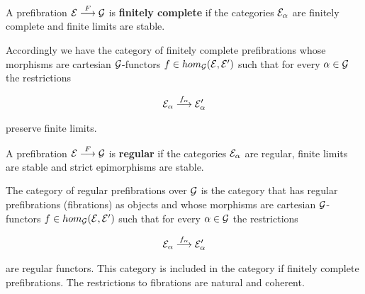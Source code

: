 
\begin{definition}
A prefibration ${\mathcal{E} \overset {F} {\longrightarrow} \mathcal{G}}$  is \textbf{finitely complete} if the categories $\mathcal{E}_\alpha$ are finitely complete and finite limits are stable.
\end{definition}

\noindent Accordingly we have the category of finitely complete prefibrations whose morphisms are cartesian $\mathcal{G}$-functors $f \in hom_{\mathcal{G}}(\mathcal{E},\mathcal{E}')$ such that for every $\alpha \in \mathcal{G}$ the restrictions 

\begin{align*}
\mathcal{E}_\alpha \overset {f_\alpha} {\longrightarrow} \mathcal{E}'_\alpha
\end{align*}

\noindent preserve finite limits. 

\begin{definition}
A prefibration ${\mathcal{E} \overset {F} {\longrightarrow} \mathcal{G}}$ is  \textbf{regular} if the categories $\mathcal{E}_\alpha$ are regular, finite limits are stable and strict epimorphisms are stable.
\end{definition}

The category of regular prefibrations  over $\mathcal{G}$ is the category that has regular prefibrations (fibrations) as objects and whose morphisms are cartesian $\mathcal{G}$-functors $f \in hom_{\mathcal{G}}(\mathcal{E},\mathcal{E}')$ such that for every $\alpha \in \mathcal{G}$ the restrictions 

\begin{align*}
\mathcal{E}_\alpha \overset {f_\alpha} {\longrightarrow} \mathcal{E}'_\alpha
\end{align*}

\noindent are regular functors. This category is included in the category if finitely complete prefibrations. The restrictions to fibrations are natural and coherent. 

